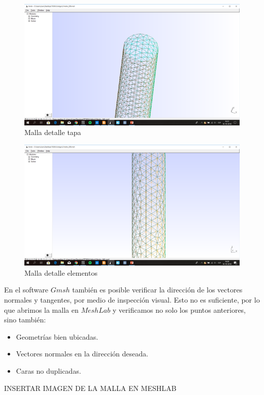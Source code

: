 \documentclass[11pt]{article}
\begin{document}
\begin{figure}[H]
\centering
\includegraphics[scale=0.8]{Imagenes/malla2.png}
\caption{Malla detalle tapa}\label{fig:malla2}
\end{figure}
\begin{figure}[H]
\centering
\includegraphics[scale=0.8]{Imagenes/malla3.png}
\caption{Malla detalle elementos}\label{fig:malla3}
\end{figure}
En el software $Gmsh$ también es posible verificar la dirección de los vectores normales y tangentes, por medio de inspección visual. Esto no es suficiente, por lo que abrimos la malla en $MeshLab$\cite{MeshLab} y verificamos no solo los puntos anteriores, sino también:
\begin{itemize}
\item Geometrías bien ubicadas.
\item Vectores normales en la dirección deseada.
\item Caras no duplicadas.
\end{itemize}
INSERTAR IMAGEN DE LA MALLA EN MESHLAB
\end{document}
